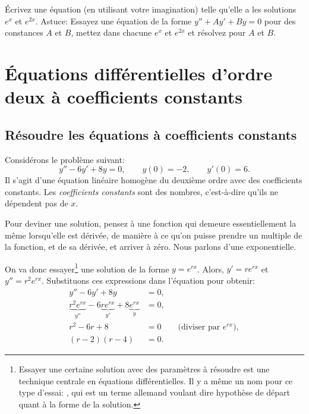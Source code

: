\begin{exercise}
	Écrivez une équation (en utilisant votre imagination) telle qu'elle a les solutions 
	$e^x$ et $e^{2x}$.  Astuce: Essayez une équation de la forme 
	$y''+Ay'+By = 0$ pour des constances $A$ et $B$,
	mettez dans chacune $e^x$ et $e^{2x}$ et résolvez pour $A$ et $B$.
	\end{exercise}



\sectionnewpage
\section{Équations différentielles d'ordre deux à coefficients constants}
\label{sec:ccsol}





\subsection{Résoudre les équations à coefficients constants}

Considérons le problème suivant: 
\begin{equation*}
	y''-6y'+8y = 0, \qquad y(0) = - 2, \qquad y'(0) = 6 .
\end{equation*}
Il s'agit d'une équation linéaire homogène du deuxième ordre avec des coefficients constants. 
Les  \emph{coefficients constants}
sont des nombres, c'est-à-dire qu'ils ne dépendent pas de $x$.  

Pour deviner une solution, pensez à une fonction qui demeure essentiellement la même lorsqu'elle est dérivée, de manière à ce qu'on puisse prendre un multiple de la fonction, et de sa dérivée,  et arriver à zéro.  Nous parlons d'une exponentielle. 

On va donc essayer$\!$\footnote{%
Essayer une certaine solution avec des paramètres à résoudre est une technique centrale en équations différentielles.  Il y a même un nom pour ce type d'essai: \emph{}, qui est un terme allemand voulant dire \og{}hypothèse de départ\fg{} quant à la forme de la solution. %
} 
une solution de la forme $y = e^{rx}$.  
Alors, $y' = r e^{rx}$ et $y'' = r^2 e^{rx}$.  
Substituons ces expressions dans l'équation pour obtenir: 
\begin{align*}
	y''-6y'+8y & = 0 , \\
	\underbrace{r^2 e^{rx}}_{y''} -6 \underbrace{r e^{rx}}_{y'}+8 \underbrace{e^{rx}}_{y} & = 0 , \\
	r^2 -6 r +8 & = 0 \qquad \text{(diviser par } e^{rx} \text{)},\\
	(r-2)(r-4) & = 0 .
\end{align*}

